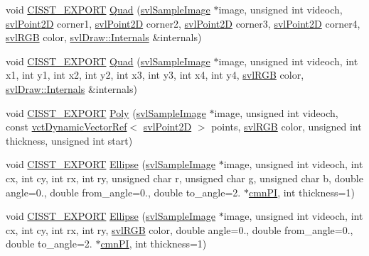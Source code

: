 \begin{DoxyCompactItemize}
void \hyperlink{cmn_export_macros_8h_a99393e0c3ac434b2605235bbe20684f8}{C\+I\+S\+S\+T\+\_\+\+E\+X\+P\+O\+R\+T} \hyperlink{namespacesvl_draw_a173abd1d3fd5668d8e21b3b1bab4bd79}{Quad} (\hyperlink{classsvl_sample_image}{svl\+Sample\+Image} $\ast$image, unsigned int videoch, \hyperlink{structsvl_point2_d}{svl\+Point2\+D} corner1, \hyperlink{structsvl_point2_d}{svl\+Point2\+D} corner2, \hyperlink{structsvl_point2_d}{svl\+Point2\+D} corner3, \hyperlink{structsvl_point2_d}{svl\+Point2\+D} corner4, \hyperlink{structsvl_r_g_b}{svl\+R\+G\+B} color, \hyperlink{classsvl_draw_1_1_internals}{svl\+Draw\+::\+Internals} \&internals)
\item 
void \hyperlink{cmn_export_macros_8h_a99393e0c3ac434b2605235bbe20684f8}{C\+I\+S\+S\+T\+\_\+\+E\+X\+P\+O\+R\+T} \hyperlink{namespacesvl_draw_ac97c2523e73434be76795dbf0ec71256}{Quad} (\hyperlink{classsvl_sample_image}{svl\+Sample\+Image} $\ast$image, unsigned int videoch, int x1, int y1, int x2, int y2, int x3, int y3, int x4, int y4, \hyperlink{structsvl_r_g_b}{svl\+R\+G\+B} color, \hyperlink{classsvl_draw_1_1_internals}{svl\+Draw\+::\+Internals} \&internals)
\item 
void \hyperlink{cmn_export_macros_8h_a99393e0c3ac434b2605235bbe20684f8}{C\+I\+S\+S\+T\+\_\+\+E\+X\+P\+O\+R\+T} \hyperlink{namespacesvl_draw_a45e9c0124dac457693ccef2333c1d863}{Poly} (\hyperlink{classsvl_sample_image}{svl\+Sample\+Image} $\ast$image, unsigned int videoch, const \hyperlink{classvct_dynamic_vector_ref}{vct\+Dynamic\+Vector\+Ref}$<$ \hyperlink{structsvl_point2_d}{svl\+Point2\+D} $>$ points, \hyperlink{structsvl_r_g_b}{svl\+R\+G\+B} color, unsigned int thickness, unsigned int start)
\item 
void \hyperlink{cmn_export_macros_8h_a99393e0c3ac434b2605235bbe20684f8}{C\+I\+S\+S\+T\+\_\+\+E\+X\+P\+O\+R\+T} \hyperlink{namespacesvl_draw_ab758055c8f92f86bb16b56c0615afb91}{Ellipse} (\hyperlink{classsvl_sample_image}{svl\+Sample\+Image} $\ast$image, unsigned int videoch, int cx, int cy, int rx, int ry, unsigned char r, unsigned char g, unsigned char b, double angle=0., double from\+\_\+angle=0., double to\+\_\+angle=2. $\ast$\hyperlink{cmn_constants_8h_aceb5aee49c7545745836d307b9b671ec}{cmn\+P\+I}, int thickness=1)
\item 
void \hyperlink{cmn_export_macros_8h_a99393e0c3ac434b2605235bbe20684f8}{C\+I\+S\+S\+T\+\_\+\+E\+X\+P\+O\+R\+T} \hyperlink{namespacesvl_draw_a70f8afc9c5d83e987b068b85455bf532}{Ellipse} (\hyperlink{classsvl_sample_image}{svl\+Sample\+Image} $\ast$image, unsigned int videoch, int cx, int cy, int rx, int ry, \hyperlink{structsvl_r_g_b}{svl\+R\+G\+B} color, double angle=0., double from\+\_\+angle=0., double to\+\_\+angle=2. $\ast$\hyperlink{cmn_constants_8h_aceb5aee49c7545745836d307b9b671ec}{cmn\+P\+I}, int thickness=1)

\end{DoxyCompactItemize}
